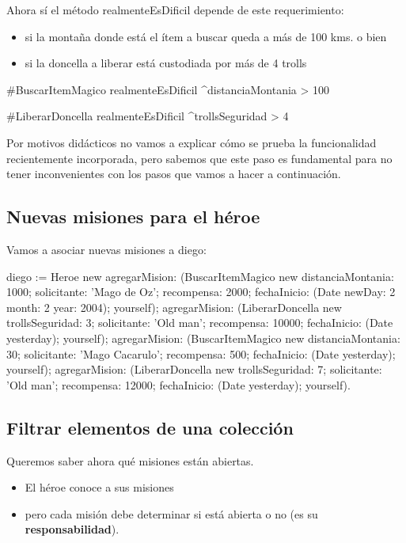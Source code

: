 \documentclass[a4paper,12pt]{book}
\begin{document}
Ahora sí el método realmenteEsDificil depende de este requerimiento:
\begin{itemize}
 \item si la montaña donde está el ítem a buscar queda a más de 100 kms. o bien 
 \item si la doncella a liberar está custodiada por más de 4 trolls
\end{itemize}

\begin{code}
#BuscarItemMagico
realmenteEsDificil      
  ^distanciaMontania > 100

#LiberarDoncella
realmenteEsDificil      
  ^trollsSeguridad > 4
\end{code}

Por motivos didácticos no vamos a explicar cómo se prueba la funcionalidad recientemente incorporada, pero
sabemos que este paso es fundamental para no tener inconvenientes con los pasos que vamos a hacer a continuación.

\subsection{Nuevas misiones para el héroe}
Vamos a asociar nuevas misiones a diego:

\begin{code}
diego := Heroe new
  agregarMision: (BuscarItemMagico new 
			distanciaMontania: 1000;
			solicitante: 'Mago de Oz';
			recompensa: 2000;
			fechaInicio: (Date newDay: 2 month: 2 year: 2004);
			yourself);
  agregarMision: (LiberarDoncella new 
			trollsSeguridad: 3;
			solicitante: 'Old man';
			recompensa: 10000;
			fechaInicio: (Date yesterday);
			yourself);
  agregarMision: (BuscarItemMagico new 
			distanciaMontania: 30;
			solicitante: 'Mago Cacarulo';
			recompensa: 500;
			fechaInicio: (Date yesterday);
			yourself);
  agregarMision: (LiberarDoncella new 
			trollsSeguridad: 7;
			solicitante: 'Old man';
			recompensa: 12000;
			fechaInicio: (Date yesterday);
			yourself).

\end{code}

\subsection{Filtrar elementos de una colección}
Queremos saber ahora qué misiones están abiertas.
\begin{itemize}
 \item El héroe conoce a sus misiones
 \item pero cada misión debe determinar si está abierta o no (es su \textbf{responsabilidad}). 
\end{itemize}
\end{document}
